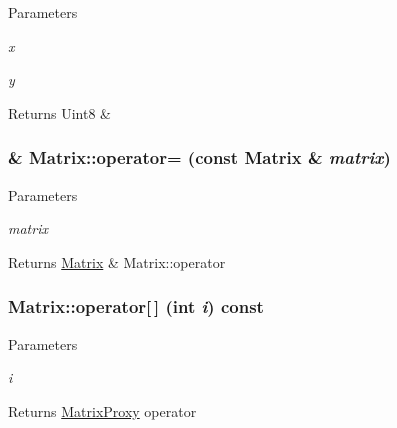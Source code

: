 \begin{DoxyParams}{Parameters}
\item[{\em x}]\item[{\em y}]\end{DoxyParams}
\begin{DoxyReturn}{Returns}
Uint8 \& 
\end{DoxyReturn}
\hypertarget{classMatrix_a45e4814b752129bed1f1316632f8543a}{
\subsubsection[{operator=}]{ \& Matrix::operator= (const {\bf Matrix} \& {\em matrix})}}
\label{classMatrix_a45e4814b752129bed1f1316632f8543a}

\begin{DoxyParams}{Parameters}
\item[{\em matrix}]\end{DoxyParams}
\begin{DoxyReturn}{Returns}
\hyperlink{classMatrix}{Matrix} \& Matrix::operator 
\end{DoxyReturn}
\hypertarget{classMatrix_ab54bf109f85ced0472a7e0c03d16471c}{
\subsubsection[{operator[]}]{ Matrix::operator\mbox{[}$\,$\mbox{]} (int {\em i}) const}}
\label{classMatrix_ab54bf109f85ced0472a7e0c03d16471c}

\begin{DoxyParams}{Parameters}
\item[{\em i}]\end{DoxyParams}
\begin{DoxyReturn}{Returns}
\hyperlink{classMatrix_1_1MatrixProxy}{MatrixProxy} operator 
\end{DoxyReturn}



